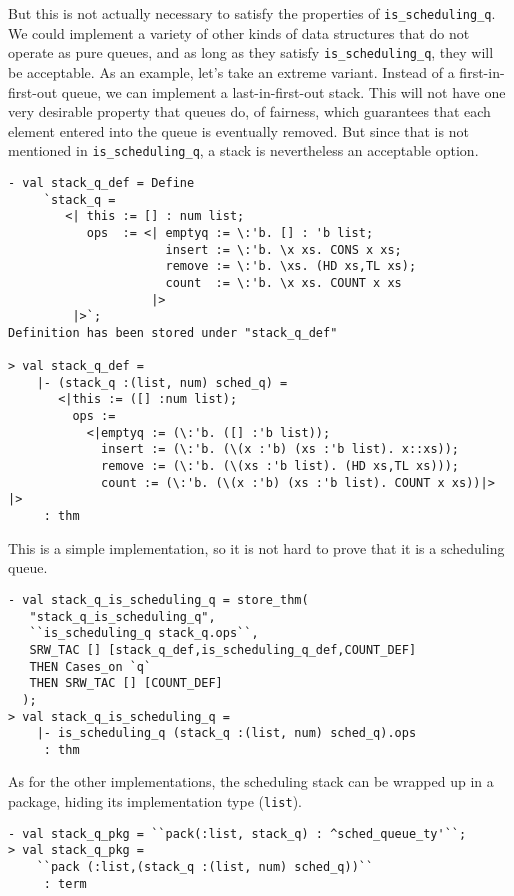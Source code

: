 But this is not actually necessary to satisfy the properties of
{\tt is\_scheduling\_q}. We could implement a variety of other
kinds of data structures that do not operate as pure queues, and
as long as they satisfy {\tt is\_scheduling\_q}, they will be
acceptable. As an example, let's take an extreme variant.
Instead of a first-in-first-out queue, we can implement a
last-in-first-out stack. This will not have one very desirable
property that queues do, of fairness, which guarantees that
each element entered into the queue is eventually removed.
But since that is not mentioned in {\tt is\_scheduling\_q},
a stack is nevertheless an acceptable option.
%
\begin{session}
\begin{verbatim}
- val stack_q_def = Define
     `stack_q =
        <| this := [] : num list;
           ops  := <| emptyq := \:'b. [] : 'b list;
                      insert := \:'b. \x xs. CONS x xs;
                      remove := \:'b. \xs. (HD xs,TL xs);
                      count  := \:'b. \x xs. COUNT x xs
                    |>
         |>`;
Definition has been stored under "stack_q_def"

> val stack_q_def =
    |- (stack_q :(list, num) sched_q) =
       <|this := ([] :num list);
         ops :=
           <|emptyq := (\:'b. ([] :'b list));
             insert := (\:'b. (\(x :'b) (xs :'b list). x::xs));
             remove := (\:'b. (\(xs :'b list). (HD xs,TL xs)));
             count := (\:'b. (\(x :'b) (xs :'b list). COUNT x xs))|> |>
     : thm
\end{verbatim}
\end{session}
\noindent
This is a simple implementation, so it is not hard to prove
that it is a scheduling queue.
\begin{session}
\begin{verbatim}
- val stack_q_is_scheduling_q = store_thm(
   "stack_q_is_scheduling_q",
   ``is_scheduling_q stack_q.ops``,
   SRW_TAC [] [stack_q_def,is_scheduling_q_def,COUNT_DEF]
   THEN Cases_on `q`
   THEN SRW_TAC [] [COUNT_DEF]
  );
> val stack_q_is_scheduling_q =
    |- is_scheduling_q (stack_q :(list, num) sched_q).ops
     : thm
\end{verbatim}
\end{session}

As for the other implementations, the scheduling stack can be
wrapped up in a package, hiding its implementation type ({\tt list}).
\begin{session}
\begin{verbatim}
- val stack_q_pkg = ``pack(:list, stack_q) : ^sched_queue_ty'``;
> val stack_q_pkg =
    ``pack (:list,(stack_q :(list, num) sched_q))``
     : term
\end{verbatim}
\end{session}

